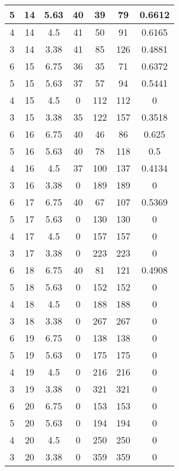 \documentclass[letterpaper, 12pt]{article}
\begin{document}
\begin{longtable}{|c|c|c|c|c|c|c|}
\hline
5 & 14 & 5.63 & 40 & 39 & 79 & 0.6612 \\
\hline
4 & 14 & 4.5 & 41 & 50 & 91 & 0.6165 \\
\hline
3 & 14 & 3.38 & 41 & 85 & 126 & 0.4881 \\
\hline
6 & 15 & 6.75 & 36 & 35 & 71 & 0.6372 \\
\hline
5 & 15 & 5.63 & 37 & 57 & 94 & 0.5441 \\
\hline
4 & 15 & 4.5 & 0 & 112 & 112 & 0 \\
\hline
3 & 15 & 3.38 & 35 & 122 & 157 & 0.3518 \\
\hline
6 & 16 & 6.75 & 40 & 46 & 86 & 0.625 \\
\hline
5 & 16 & 5.63 & 40 & 78 & 118 & 0.5 \\
\hline
4 & 16 & 4.5 & 37 & 100 & 137 & 0.4134 \\
\hline
3 & 16 & 3.38 & 0 & 189 & 189 & 0 \\
\hline
6 & 17 & 6.75 & 40 & 67 & 107 & 0.5369 \\
\hline
5 & 17 & 5.63 & 0 & 130 & 130 & 0 \\
\hline
4 & 17 & 4.5 & 0 & 157 & 157 & 0 \\
\hline
3 & 17 & 3.38 & 0 & 223 & 223 & 0 \\
\hline
6 & 18 & 6.75 & 40 & 81 & 121 & 0.4908 \\
\hline
5 & 18 & 5.63 & 0 & 152 & 152 & 0 \\
\hline
4 & 18 & 4.5 & 0 & 188 & 188 & 0 \\
\hline
3 & 18 & 3.38 & 0 & 267 & 267 & 0 \\
\hline
6 & 19 & 6.75 & 0 & 138 & 138 & 0 \\
\hline
5 & 19 & 5.63 & 0 & 175 & 175 & 0 \\
\hline
4 & 19 & 4.5 & 0 & 216 & 216 & 0 \\
\hline
3 & 19 & 3.38 & 0 & 321 & 321 & 0 \\
\hline
6 & 20 & 6.75 & 0 & 153 & 153 & 0 \\
\hline
5 & 20 & 5.63 & 0 & 194 & 194 & 0 \\
\hline
4 & 20 & 4.5 & 0 & 250 & 250 & 0 \\
\hline
3 & 20 & 3.38 & 0 & 359 & 359 & 0 \\
\hline
\end{longtable}
\end{document}
